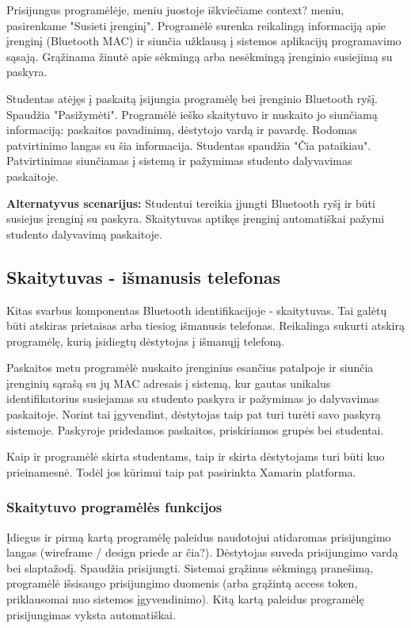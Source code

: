 \documentclass{VUMIFPSkursinis}
\begin{document}

Prisijungus programėlėje, meniu juostoje iškviečiame context? meniu, pasirenkame "Susieti įrenginį". Programėlė surenka reikalingą informaciją apie įrenginį (Bluetooth MAC) ir siunčia užklausą į sistemos aplikacijų programavimo sąsają. Grąžinama žinutė apie sėkmingą arba nesėkmingą įrenginio susiejimą su paskyra.


Studentas atėjęs į paskaitą įsijungia programėlę bei įrenginio Bluetooth ryšį. Spaudžia "Pasižymėti". Programėlė ieško skaitytuvo ir nuskaito jo siunčiamą informaciją: paskaitos pavadinimą, dėstytojo vardą ir pavardę. Rodomas patvirtinimo langas su šia informacija. Studentas spaudžia "Čia pataikiau". Patvirtinimas siunčiamas į sistemą ir pažymimas studento dalyvavimas paskaitoje.

\textbf{Alternatyvus scenarijus:} Studentui tereikia įjungti Bluetooth ryšį ir būti susiejus įrenginį su paskyra. Skaitytuvas aptikęs įrenginį automatiškai pažymi studento dalyvavimą paskaitoje.

\subsection{Skaitytuvas - išmanusis telefonas}
Kitas svarbus komponentas Bluetooth identifikacijoje - skaitytuvas. Tai galėtų būti atskiras prietaisas arba tiesiog išmanusis telefonas. Reikalinga sukurti atskirą programėlę, kurią įsidiegtų dėstytojas į išmanųjį telefoną.

Paskaitos metu programėlė nuskaito įrenginius esančius patalpoje ir siunčia įrenginių sąrašą su jų MAC adresais į sistemą, kur gautas unikalus identifikatorius susiejamas su studento paskyra ir pažymimas jo dalyvavimas paskaitoje. Norint tai įgyvendint, dėstytojas taip pat turi turėti savo paskyrą sistemoje. Paskyroje pridedamos paskaitos, priskiriamos grupės bei studentai.

Kaip ir programėlė skirta studentams, taip ir skirta dėstytojams turi būti kuo prieinamesnė. Todėl jos kūrimui taip pat pasirinkta Xamarin platforma.

\subsubsection{Skaitytuvo programėlės funkcijos}


Įdiegus ir pirmą kartą programėlę paleidus naudotojui atidaromas prisijungimo langas (wireframe / design priede ar čia?). Dėstytojas suveda prisijungimo vardą bei slaptažodį. Spaudžia prisijungti. Sistemai grąžinus sėkmingą pranešimą, programėlė išsisaugo prisijungimo duomenis (arba grąžintą access token, priklausomai nuo sistemos įgyvendinimo). Kitą kartą paleidus programėlę prisijungimas vyksta automatiškai.
\end{document}
